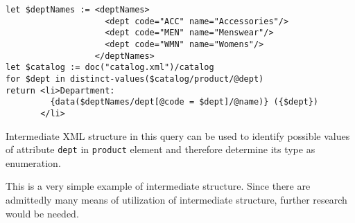 \begin{verbatim}
let $deptNames := <deptNames> 
                    <dept code="ACC" name="Accessories"/> 
                    <dept code="MEN" name="Menswear"/> 
                    <dept code="WMN" name="Womens"/> 
                  </deptNames> 
let $catalog := doc("catalog.xml")/catalog 
for $dept in distinct-values($catalog/product/@dept) 
return <li>Department:
         {data($deptNames/dept[@code = $dept]/@name)} ({$dept})
       </li> 
\end{verbatim}

Intermediate XML structure in this query can be used to identify possible values of attribute \texttt{dept} in \texttt{product} element and therefore determine its type as enumeration.

This is a very simple example of intermediate structure. Since there are admittedly many means of utilization of intermediate structure, further research would be needed.